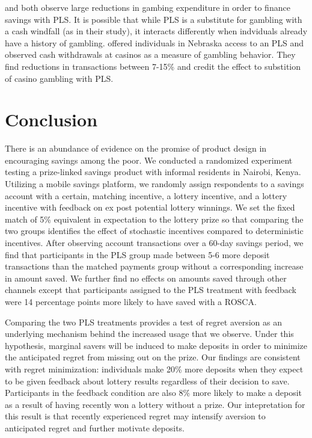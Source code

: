 \documentclass[11pt]{article}
\begin{document}

		\textcite{atalay_savings_2014} and \textcite{dizon_leveraging_2016} both observe large reductions in gambing expenditure in order to finance savings with PLS. It is possible that while PLS is a substitute for gambling with a cash windfall (as in their study), it interacts differently when indviduals already have a history of gambling. \textcite{cookson_when_2016} offered individuals in Nebraska access to an PLS and observed cash withdrawals at casinos as a measure of gambling behavior. They find reductions in transactions between 7-15\% and credit the effect to substition of casino gambling with PLS.

		

\section{Conclusion} \label{sec:conclusion}

	There is an abundance of evidence on the promise of product design in encouraging savings among the poor. We conducted a randomized experiment testing a prize-linked savings product with informal residents in Nairobi, Kenya. Utilizing a mobile savings platform, we randomly assign respondents to a savings account with a certain, matching incentive, a lottery incentive, and a lottery incentive with feedback on ex post potential lottery winnings. We set the fixed match of 5\% equivalent in expectation to the lottery prize so that comparing the two groups identifies the effect of stochastic incentives compared to deterministic incentives. After observing account transactions over a 60-day savings period, we find that participants in the PLS group made between 5-6 more deposit transactions than the matched payments group without a corresponding increase in amount saved. We further find no effects on amounts saved through other channels except that participants assigned to the PLS treatment with feedback were 14 percentage points more likely to have saved with a ROSCA.

	Comparing the two PLS treatments provides a test of regret aversion as an underlying mechanism behind the increased usage that we observe. Under this hypothesis, marginal savers will be induced to make deposits in order to minimize the anticipated regret from missing out on the prize. Our findings are consistent with regret minimization: individuals make 20\% more deposits when they expect to be given feedback about lottery results regardless of their decision to save. Participants in the feedback condition are also 8\% more likely to make a deposit as a result of having recently won a lottery without a prize. Our intepretation for this result is that recently experienced regret may intensify aversion to anticipated regret and further motivate deposits.
\end{document}

